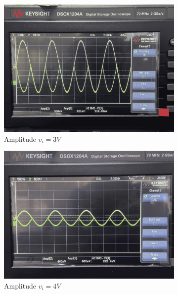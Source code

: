\begin{figure}[H]
        \begin{subfigure}{0.3\linewidth}
            \includegraphics[width=1\linewidth]{Experiment_13/Images/13_3v.jpg}
            \caption{Amplitude $v_i=3V$}
            \label{wave:13-AC3}
        \end{subfigure}
        \begin{subfigure}{0.3\linewidth}
            \includegraphics[width=1\linewidth]{Experiment_13/Images/13_4v.jpg}
            \caption{Amplitude $v_i=4V$}
            \label{wave:13-AC4}
        \end{subfigure}
        \begin{subfigure}{0.3\linewidth}

\end{subfigure}
\end{figure}
